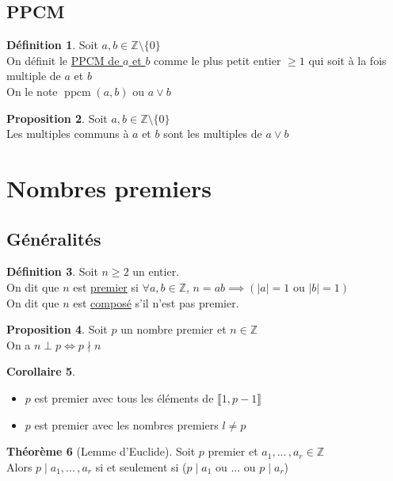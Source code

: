\documentclass[10pt,a4paper]{article}
\theoremstyle{definition}
\newtheorem{proposition}{Proposition}[section]
\newtheorem{theorem}[proposition]{Théorème}
\newtheorem{corollaire}[proposition]{Corollaire}
\newtheorem{definition}[proposition]{Définition}
\DeclareMathOperator{\ppcm}{ppcm}
\begin{document}
\subsection{PPCM}
\begin{definition}
Soit $a, b \in \mathbb{Z} \setminus \{ 0 \}$ \\
On définit le \uline{PPCM de $a$ et $b$} comme le plus petit entier $\geq 1$ qui soit à la fois multiple de $a$ et $b$ \\
On le note $\ppcm(a, b)$ ou $a \vee b$
\end{definition}
\begin{proposition}
Soit $a, b \in \mathbb{Z} \setminus \{ 0 \}$ \\
Les multiples communs à $a$ et $b$ sont les multiples de $a \vee b$
\end{proposition}

\section{Nombres premiers}
\subsection{Généralités}
\begin{definition}
Soit $n \geq 2$ un entier. \\
On dit que $n$ est \uline{premier} si $\forall a, b \in \mathbb{Z}$, $n = ab \implies (|a| = 1 \text{ ou } |b| = 1)$ \\
On dit que $n$ est \uline{composé} s'il n'est pas premier.
\end{definition}
\begin{proposition}
Soit $p$ un nombre premier et $n \in \mathbb{Z}$ \\
On a $n \perp p \iff p \nmid n$
\end{proposition}
\begin{corollaire}
\hfill
\begin{itemize}
\item $p$ est premier avec tous les éléments de $\llbracket 1, p - 1 \rrbracket$
\item $p$ est premier avec les nombres premiers $l \neq p$
\end{itemize}
\end{corollaire}
\begin{theorem}[Lemme d'Euclide]
Soit $p$ premier et $a_1, ...\,, a_r \in \mathbb{Z}$ \\
Alors $p \mid a_1, ...\,, a_r$ si et seulement si ($p \mid a_1$ ou ... ou $p \mid a_r$)
\end{theorem}
\end{document}
